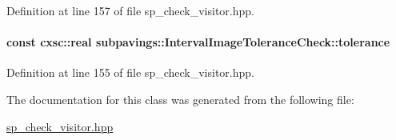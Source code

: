 \-Definition at line 157 of file sp\-\_\-check\-\_\-visitor.\-hpp.

\hypertarget{classsubpavings_1_1IntervalImageToleranceCheck_a32e81664f6d68908ac63b89e5b24afa7}{
\paragraph[{tolerance}]{\setlength{\rightskip}{0pt plus 5cm}const cxsc\-::real {\bf subpavings\-::\-Interval\-Image\-Tolerance\-Check\-::tolerance}}}\label{classsubpavings_1_1IntervalImageToleranceCheck_a32e81664f6d68908ac63b89e5b24afa7}


\-Definition at line 155 of file sp\-\_\-check\-\_\-visitor.\-hpp.



\-The documentation for this class was generated from the following file\-:\begin{DoxyCompactItemize}
\item 
\hyperlink{sp__check__visitor_8hpp}{sp\-\_\-check\-\_\-visitor.\-hpp}\end{DoxyCompactItemize}
